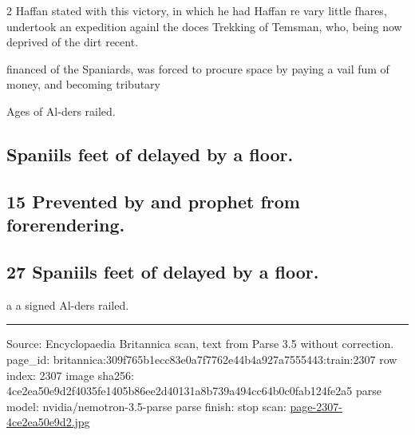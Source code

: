 \documentclass[10pt]{article}
\begin{document}
\begin{multicols}{2}
Haffan stated with this victory, in which he had Haffan re vary little fhares, undertook an expedition againl the doces Trekking of Temsman, who, being now deprived of the dirt recent.

financed of the Spaniards, was forced to procure space by paying a vail fum of money, and becoming tributary

Ages of Al-ders railed.

\subsection*{Spaniils feet of delayed by a floor.}
\subsection*{15 Prevented by and prophet from forerendering.}
\subsection*{27 Spaniils feet of delayed by a floor.}
a a signed Al-ders railed.

\end{multicols}
\vfill\par\noindent\rule{\linewidth}{0.4pt}\par
{\scriptsize\color{gray}\noindent Source: Encyclopaedia Britannica scan, text from Parse 3.5 without correction. page\_id: britannica:309f765b1ecc83e0a7f7762e44b4a927a7555443:train:2307 \quad row index: 2307 \quad image sha256: 4ce2ea50e9d2f4035fe1405b86ee2d40131a8b739a494cc64b0c0fab124fe2a5 \quad parse model: nvidia/nemotron-3.5-parse \quad parse finish: stop \quad scan: \href{../scans/page-2307-4ce2ea50e9d2.jpg}{page-2307-4ce2ea50e9d2.jpg}\par}
\end{document}
